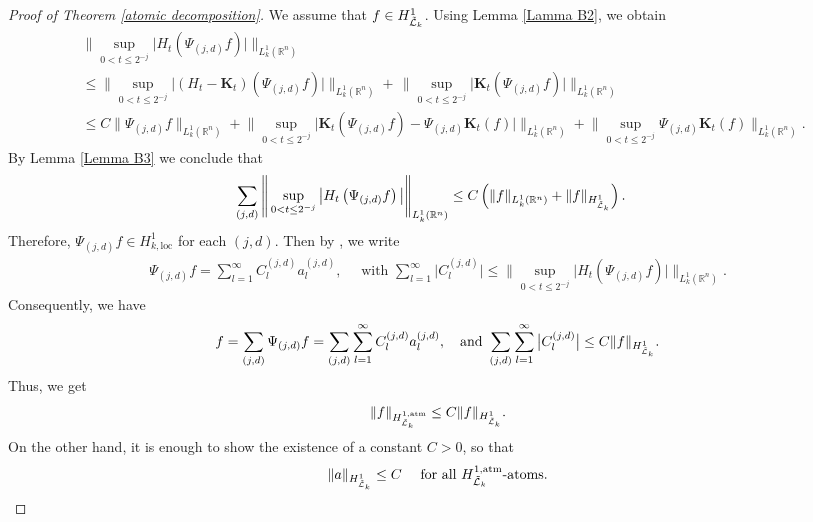 \documentclass[11pt, reqno]{amsproc}
\theoremstyle{definition}
\theoremstyle{remark}
\numberwithin{equation}{section}
\begin{document}
\begin{proof}[Proof of Theorem \ref{atomic decomposition}]
    We assume that $f\in H^1_{\Tilde{\mathcal{L}}_k}$. Using Lemma \ref{Lamma B2}, we obtain  
    \begin{align*}
        &\Bigg\|  \sup_{0<t \leq 2^{-j}}  \big| H_t\left( 
        \Psi_{(j,d)}f  \right)\big|  \Bigg\|_{L_k^1(\mathbb{R}^n)} \\ & \leq \Bigg\| \sup_{0<t \leq 2^{-j}}  \big| (H_t-\mathbf{K}_t)\left( 
        \Psi_{(j,d)}f  \right)\big|  \Bigg\|_{L_k^1(\mathbb{R}^n)} +\, \Bigg\| \sup_{0<t \leq 2^{-j}}  \big| \mathbf{K}_t\left( 
        \Psi_{(j,d)}f  \right)\big|  \Bigg\|_{L_k^1(\mathbb{R}^n)}\\
        & \leq C \|\Psi_{(j,d)}f\|_{L_k^1(\mathbb{R}^n)} + \Bigg\| \sup_{0<t \leq 2^{-j}}  \big| \mathbf{K}_t\left( 
        \Psi_{(j,d)}f  \right) -\Psi_{(j,d)}\mathbf{K}_t(f)\big|  \Bigg\|_{L_k^1(\mathbb{R}^n)} +   \Bigg\| \sup_{0<t \leq 2^{-j}}\Psi_{(j,d)}\mathbf{K}_t(f)\Bigg\|_{L_k^1(\mathbb{R}^n)}.
    \end{align*} By Lemma \ref{Lemma B3} we conclude that
   \begin{align*}
     \sum_{(j,d)}  \Bigg\| & \sup_{0<t \leq 2^{-j}}  \big| H_t\left( 
        \Psi_{(j,d)}f  \right)\big|  \Bigg\|_{L_k^1(\mathbb{R}^n)} \leq C\left( \|f\|_{L_k^1(\mathbb{R}^n)} + \|f\|_{H_{\Tilde{\mathcal{L}}_k}^1} \right).
   \end{align*}
Therefore,  $\Psi_{(j,d)}f\in H_{k,\text{loc}}^1$ for each $(j,d)$. Then by \cite[Proposition 4]{Hejna-2021}, we write 
    \begin{align*}
        \Psi_{(j,d)}f= \sum_{l=1} ^ \infty C^{(j,d)}_l a_l^{(j,d)}, \quad \text{ with } \sum_{l=1}^ \infty \Big|C^{(j,d)}_l\Big| \leq \Bigg\|  \sup_{0<t \leq 2^{-j}}  \big| H_t\left( 
        \Psi_{(j,d)}f  \right)\big|  \Bigg\|_{L_k^1(\mathbb{R}^n)}.
    \end{align*}  Consequently, we have 
    \begin{align*}
        f = \sum_{(j,d)}\Psi_{(j,d)}f = \sum_{(j,d)}  \sum_{l=1}^ \infty C^{(j,d)}_l a_l^{(j,d)}, \quad \text{and } \sum_{(j,d)}  \sum_{l=1}^ \infty \big|C^{(j,d)}_l\big| \leq  C \|f\|_{H^1_{\Tilde{\mathcal{L}}_k}}.
    \end{align*}  Thus, we get  
    $$  \|f\|_{H_{\Tilde{\mathcal{L}}_k}^{1,\text{atm}}} \leq C \|f\|_{H^1_{\Tilde{\mathcal{L}}_k}}.$$
    On the other hand, it is enough to show the existence of a constant $C>0$, so that 
    \begin{align*}
        \|a\|_{H^1_{\Tilde{\mathcal{L}}_k}} \leq C \quad \text{ for all $H_{\Tilde{\mathcal{L}}_k}^{1,\text{atm}}$-atoms.}

\end{align*}
\end{proof}
\end{document}
